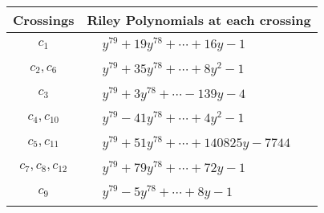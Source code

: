 \documentclass[1p]{elsarticle_modified}
\theoremstyle{definition}
\begin{document}
\begin{tabular}{m{50pt}|m{274pt}}
Crossings & \hspace{64pt}Riley Polynomials at each crossing \\
\hline $$\begin{aligned}c_{1}\end{aligned}$$&$\begin{aligned}
&y^{79}+19 y^{78}+\cdots+16 y-1
\end{aligned}$\\
\hline $$\begin{aligned}c_{2},c_{6}\end{aligned}$$&$\begin{aligned}
&y^{79}+35 y^{78}+\cdots+8 y^2-1
\end{aligned}$\\
\hline $$\begin{aligned}c_{3}\end{aligned}$$&$\begin{aligned}
&y^{79}+3 y^{78}+\cdots-139 y-4
\end{aligned}$\\
\hline $$\begin{aligned}c_{4},c_{10}\end{aligned}$$&$\begin{aligned}
&y^{79}-41 y^{78}+\cdots+4 y^2-1
\end{aligned}$\\
\hline $$\begin{aligned}c_{5},c_{11}\end{aligned}$$&$\begin{aligned}
&y^{79}+51 y^{78}+\cdots+140825 y-7744
\end{aligned}$\\
\hline $$\begin{aligned}c_{7},c_{8},c_{12}\end{aligned}$$&$\begin{aligned}
&y^{79}+79 y^{78}+\cdots+72 y-1
\end{aligned}$\\
\hline $$\begin{aligned}c_{9}\end{aligned}$$&$\begin{aligned}
&y^{79}-5 y^{78}+\cdots+8 y-1
\end{aligned}$\\
\hline
\end{tabular}
\vskip 2pc
\end{document}
